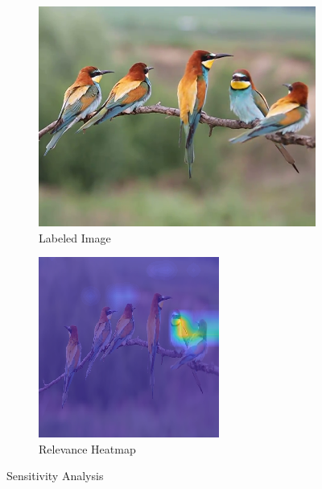 \begin{figure}
     \centering
     \begin{subfigure}[b]{0.45\textwidth}
         \centering
         \includegraphics[width=\textwidth]{images/birds-2.png}
         \caption{Labeled Image}
         \label{fig:group-of-birds}
     \end{subfigure}
     \hfill
     \begin{subfigure}[b]{0.35\textwidth}
         \centering
         \includegraphics[width=\textwidth]{images/hm-layer-17.png}
         \caption{Relevance Heatmap}
         \label{fig:heatmap-birds}
     \end{subfigure}
        \caption{Sensitivity Analysis}
        \label{fig:sensitivity-analysis}
\end{figure}

